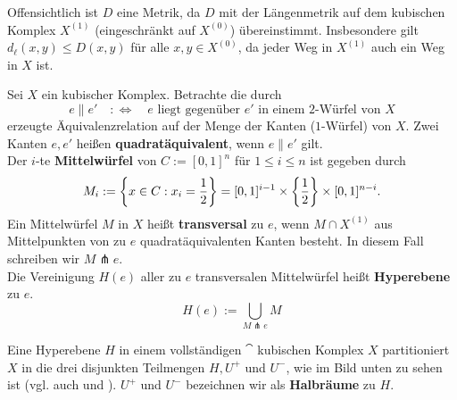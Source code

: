 \begin{bemerkung}
	Offensichtlich ist $D$ eine Metrik, da $D$ mit der Längenmetrik auf dem kubischen Komplex $X^{(1)}$ (eingeschränkt auf $X^{(0)}$) übereinstimmt. Insbesondere gilt $d_\ell(x,y) \leq D(x,y)$ für alle $x,y \in X^{(0)}$, da jeder Weg in $X^{(1)}$ auch ein Weg in $X$ ist.
\end{bemerkung}

\begin{definition}
	Sei $X$ ein kubischer Komplex. Betrachte die durch
	\[ e \parallel e' \quad :\Leftrightarrow \quad e \text{ liegt gegenüber } e' \text{ in einem } 2\text{-Würfel von } X\]
	erzeugte Äquivalenzrelation auf der Menge der Kanten ($1$-Würfel) von $X$. Zwei Kanten $e, e'$ heißen \textbf{quadratäquivalent}, wenn $e \parallel e'$ gilt. \\	
	Der $i$-te \textbf{Mittelwürfel} von $C := [0,1]^n$ für $1 \leq i \leq n$ ist gegeben durch
	\[
	M_i := \penbrace*{x \in C : x_i = \frac{1}{2}} = [0,1]^{i-1} \times \penbrace*{\frac{1}{2}} \times [0,1]^{n-i}.
	\]
	Ein Mittelwürfel $M$ in $X$ heißt \textbf{transversal} zu $e$, wenn $M \cap X^{(1)}$ aus Mittelpunkten von zu $e$ quadratäquivalenten Kanten besteht. In diesem Fall schreiben wir $M \pitchfork e$. \\
	Die Vereinigung $H(e)$ aller zu $e$ transversalen Mittelwürfel heißt \textbf{Hyperebene} zu $e$.
	\[ H(e) := \bigcup_{M \pitchfork e} M \]
\end{definition}
Eine Hyperebene $H$ in einem vollständigen $\cat$ kubischen Komplex $X$ partitioniert $X$ in die drei disjunkten Teilmengen $H, U^+$ und $U^-$, wie im Bild unten zu sehen ist (vgl. auch \cite[Prop. 3.4]{Schwer} und \cite[Prop. 4.10]{Sageev}). $U^+$ und $U^-$ bezeichnen wir als \textbf{Halbräume} zu $H$.

